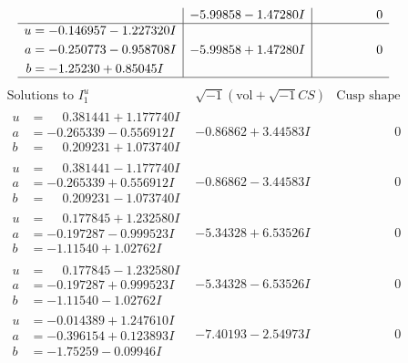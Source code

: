 \documentclass[1p]{elsarticle_modified}
\theoremstyle{definition}
\newcommand{\I}{\sqrt{-1}}
\begin{document}
$$\begin{array}{c|c|c}
 & -5.99858 - 1.47280 I & \phantom{-0.000000 } 0 \\ \hline\begin{aligned}
u &= -0.146957 - 1.227320 I \\
a &= -0.250773 - 0.958708 I \\
b &= -1.25230 + 0.85045 I\end{aligned}
 & -5.99858 + 1.47280 I & \phantom{-0.000000 } 0\\
 \hline 
 \end{array}$$\newpage$$\begin{array}{c|c|c}  
\text{Solutions to }I^u_{1}& \I (\text{vol} + \sqrt{-1}CS) & \text{Cusp shape}\\
 \hline 
\begin{aligned}
u &= \phantom{-}0.381441 + 1.177740 I \\
a &= -0.265339 - 0.556912 I \\
b &= \phantom{-}0.209231 + 1.073740 I\end{aligned}
 & -0.86862 + 3.44583 I & \phantom{-0.000000 } 0 \\ \hline\begin{aligned}
u &= \phantom{-}0.381441 - 1.177740 I \\
a &= -0.265339 + 0.556912 I \\
b &= \phantom{-}0.209231 - 1.073740 I\end{aligned}
 & -0.86862 - 3.44583 I & \phantom{-0.000000 } 0 \\ \hline\begin{aligned}
u &= \phantom{-}0.177845 + 1.232580 I \\
a &= -0.197287 - 0.999523 I \\
b &= -1.11540 + 1.02762 I\end{aligned}
 & -5.34328 + 6.53526 I & \phantom{-0.000000 } 0 \\ \hline\begin{aligned}
u &= \phantom{-}0.177845 - 1.232580 I \\
a &= -0.197287 + 0.999523 I \\
b &= -1.11540 - 1.02762 I\end{aligned}
 & -5.34328 - 6.53526 I & \phantom{-0.000000 } 0 \\ \hline\begin{aligned}
u &= -0.014389 + 1.247610 I \\
a &= -0.396154 + 0.123893 I \\
b &= -1.75259 - 0.09946 I\end{aligned}
 & -7.40193 - 2.54973 I & \phantom{-0.000000 } 0 \\ \hline\begin{aligned}

\end{aligned}
\end{array}$$
\end{document}
